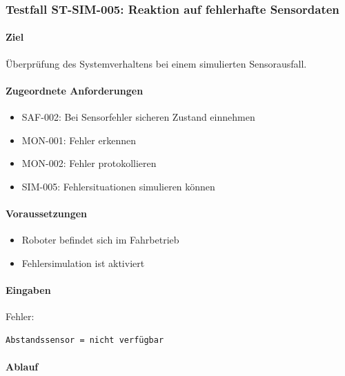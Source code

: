 \subsubsection{Testfall ST-SIM-005: Reaktion auf fehlerhafte
Sensordaten}\label{testfall-st-sim-005-reaktion-auf-fehlerhafte-sensordaten}

\paragraph{Ziel}\label{ziel-20}

Überprüfung des Systemverhaltens bei einem simulierten Sensorausfall.

\paragraph{Zugeordnete
Anforderungen}\label{zugeordnete-anforderungen-20}

\begin{itemize}
\tightlist
\item
  SAF-002: Bei Sensorfehler sicheren Zustand einnehmen
\item
  MON-001: Fehler erkennen
\item
  MON-002: Fehler protokollieren
\item
  SIM-005: Fehlersituationen simulieren können
\end{itemize}

\paragraph{Voraussetzungen}\label{voraussetzungen-20}

\begin{itemize}
\tightlist
\item
  Roboter befindet sich im Fahrbetrieb
\item
  Fehlersimulation ist aktiviert
\end{itemize}

\paragraph{Eingaben}\label{eingaben-17}

Fehler:

\begin{verbatim}
Abstandssensor = nicht verfügbar
\end{verbatim}

\paragraph{Ablauf}\label{ablauf-20}

